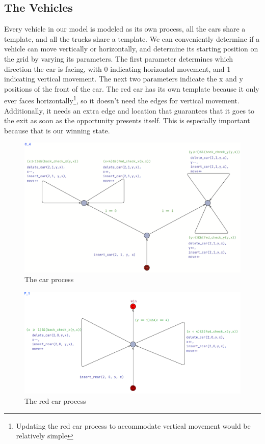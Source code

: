 \documentclass{article}
\begin{document}
\subsection{The Vehicles}
Every vehicle in our model is modeled as its own process, all the cars share a template, and all the trucks share a template. We can conveniently determine if a vehicle can move vertically or horizontally, and determine its starting position on the grid by varying its parameters. The first parameter determines which direction the car is facing, with 0 indicating horizontal movement, and 1 indicating vertical movement. The next two parameters indicate the x and y positions of the front of the car. The red car has its own template because it only ever faces horizontally\footnote{Updating the red car process to accommodate vertical movement would be relatively simple}, so it doesn't need the edges for vertical movement. Additionally, it needs an extra edge and location that guarantees that it goes to the exit as soon as the opportunity presents itself. This is especially important because that is our winning state.

\begin{figure}
    \centering
    \includegraphics[width=0.9\linewidth]{images/c4.png}
    \caption{The car process}
\end{figure}

\begin{figure}[hbt!]
    \centering
    \includegraphics[width=0.8\linewidth]{images/redcar.png}
    \caption{The red car process}
\end{figure}
\end{document}
